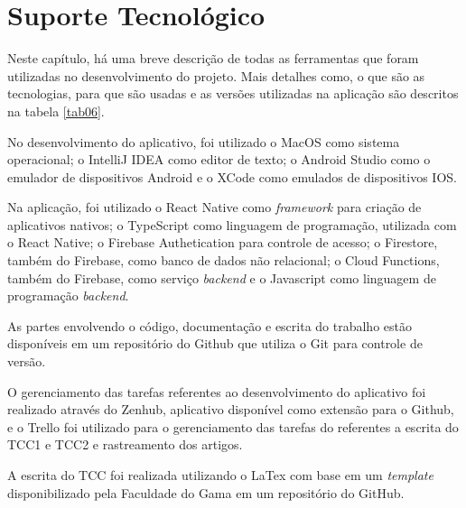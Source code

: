 \chapter[Suporte Tecnológico]{Suporte Tecnológico}
\label{ch:suporte}

Neste capítulo, há uma breve descrição de todas as ferramentas que foram 
utilizadas no desenvolvimento do projeto. Mais detalhes como, o que são as tecnologias, para que são usadas e 
as versões utilizadas na aplicação são descritos na tabela \ref{tab06}.

No desenvolvimento do aplicativo, foi utilizado o MacOS como sistema 
operacional; o IntelliJ IDEA como editor de texto; o Android Studio como 
o emulador de dispositivos Android e o XCode como emulados de dispositivos IOS. 

Na aplicação, foi utilizado o React Native 
como \emph{framework} para criação de aplicativos nativos; o TypeScript como linguagem 
de programação, utilizada com o React Native; o Firebase Authetication para controle de acesso; 
o Firestore, também do Firebase, como banco de dados não relacional; o Cloud Functions, também do Firebase,
como serviço \emph{backend} e o Javascript 
como linguagem de programação \emph{backend}.

As partes envolvendo o código, documentação e escrita do trabalho estão disponíveis 
em um repositório do Github que utiliza o Git para controle de versão.

O gerenciamento das tarefas referentes ao desenvolvimento do aplicativo foi realizado através do Zenhub, 
aplicativo disponível como extensão para o Github, 
e o Trello foi utilizado para o gerenciamento das tarefas do referentes a escrita do TCC1 e TCC2 e 
rastreamento dos artigos. 

A escrita do TCC foi realizada utilizando o LaTex com base em um \emph{template} 
disponibilizado pela Faculdade do Gama em um repositório do GitHub. 

